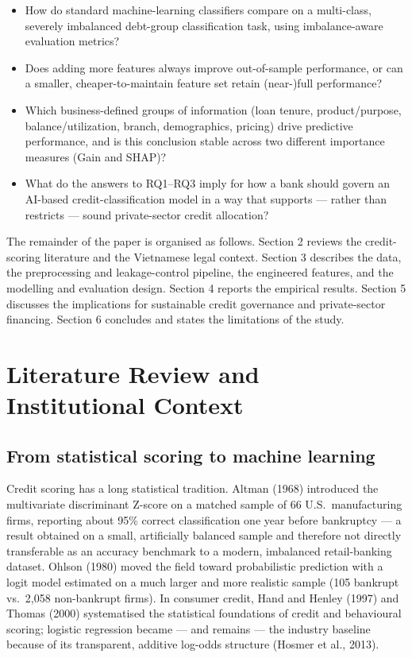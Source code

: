 \documentclass[11pt,a4paper]{article}
\begin{document}
\begin{itemize}[leftmargin=2.2em]
\item[\textbf{RQ1.}] How do standard machine-learning classifiers compare on a multi-class, severely imbalanced debt-group classification task, using imbalance-aware evaluation metrics?
\item[\textbf{RQ2.}] Does adding more features always improve out-of-sample performance, or can a smaller, cheaper-to-maintain feature set retain (near-)full performance?
\item[\textbf{RQ3.}] Which business-defined groups of information (loan tenure, product/purpose, balance/utilization, branch, demographics, pricing) drive predictive performance, and is this conclusion stable across two different importance measures (Gain and SHAP)?
\item[\textbf{RQ4.}] What do the answers to RQ1--RQ3 imply for how a bank should govern an AI-based credit-classification model in a way that supports --- rather than restricts --- sound private-sector credit allocation?
\end{itemize}

The remainder of the paper is organised as follows. Section 2 reviews the credit-scoring literature and the Vietnamese legal context. Section 3 describes the data, the preprocessing and leakage-control pipeline, the engineered features, and the modelling and evaluation design. Section 4 reports the empirical results. Section 5 discusses the implications for sustainable credit governance and private-sector financing. Section 6 concludes and states the limitations of the study.

\section{Literature Review and Institutional Context}

\subsection{From statistical scoring to machine learning}

Credit scoring has a long statistical tradition. Altman (1968) introduced the multivariate discriminant Z-score on a matched sample of 66 U.S.\ manufacturing firms, reporting about 95\% correct classification one year before bankruptcy --- a result obtained on a small, artificially balanced sample and therefore not directly transferable as an accuracy benchmark to a modern, imbalanced retail-banking dataset. Ohlson (1980) moved the field toward probabilistic prediction with a logit model estimated on a much larger and more realistic sample (105 bankrupt vs.\ 2{,}058 non-bankrupt firms). In consumer credit, Hand and Henley (1997) and Thomas (2000) systematised the statistical foundations of credit and behavioural scoring; logistic regression became --- and remains --- the industry baseline because of its transparent, additive log-odds structure (Hosmer et al., 2013).
\end{document}
